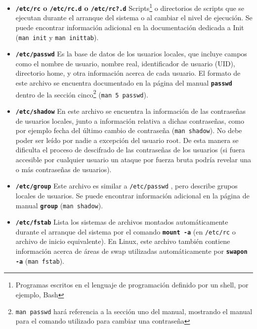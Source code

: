 \documentclass[12pt]{article}
\begin{document}
\begin{itemize} 

\item \textbf{\texttt{/etc/rc} o
\texttt{/etc/rc.d} o \texttt{/etc/rc?.d}}
Scripts\footnote{Programas escritos en el lenguaje de programación definido por 
un shell, por ejemplo, Bash} o 
directorios de scripts que se ejecutan durante el
arranque del sistema o al cambiar el nivel de ejecución. Se puede
encontrar información adicional en la documentación dedicada a Init (\texttt{man init} y 
\texttt{man inittab}).

\item \textbf{\texttt{/etc/passwd}}
 Es la base de datos de los usuarios locales, que incluye campos como el
nombre de usuario, nombre real, identificador de usuario (UID), directorio home, y otra
información acerca de cada usuario.  El formato de este archivo se encuentra
documentado en la página del manual \texttt{\textbf{passwd}} dentro
de la sección cinco\footnote{\texttt{man passwd} hará referencia a la sección uno
del manual, mostrando el manual para el comando utilizado para cambiar una contraseña} 
(\texttt{man 5 passwd}). 

\item  \textbf{\texttt{/etc/shadow}}
 En este archivo se encuentra la información de las contraseñas de usuarios locales, junto 
a información relativa a dichas contraseñas, como por ejemplo fecha del último cambio
de contraseña (\texttt{man shadow}). No debe poder ser leído por nadie a excepción 
del usuario root. De esta manera se dificulta el proceso de descifrado de las contraseñas 
de los usuarios (si fuera accesible por cualquier usuario un ataque por fuerza bruta podría
revelar una o más contraseñas de usuarios).

\item \textbf{\texttt{/etc/group}}
 Este archivo es similar a \texttt{/etc/passwd} , pero describe grupos locales
de usuarios. Se puede encontrar información adicional en la página de manual 
\texttt{\textbf{group}} (\texttt{man shadow}).  

\item \textbf{\texttt{/etc/fstab}}
   Lista los sistemas de archivos montados automáticamente
durante el arranque del sistema por el comando \texttt{\textbf{mount
-a}} (en \texttt{/etc/rc} o archivo de inicio
equivalente). En Linux, este archivo también
contiene información acerca de áreas de swap utilizadas
automáticamente por \texttt{\textbf{swapon -a}} (\texttt{man fstab}).  


\end{itemize}
\end{document}
